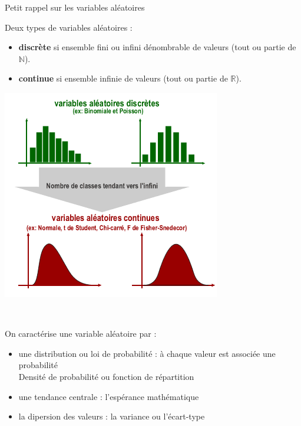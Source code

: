 \documentclass{beamer}
\newcommand{\N}{\mathbb{N}}
\begin{document}
\begin{frame}{Petit rappel sur les variables aléatoires}

\begin{minipage}{0.6\linewidth}
Deux types de variables aléatoires :
 \begin{itemize}
\item {\bf discrète} si ensemble fini ou infini dénombrable de
valeurs (tout ou partie de $\mathbb{\N}$).
\item {\bf continue} si ensemble infinie de valeurs (tout ou partie de $\mathbb{R}$).
\end{itemize}
\end{minipage}
\begin{minipage}{0.3\linewidth} 
\includegraphics[scale=0.45]{images/var_discretes_continues.png}
\end{minipage}

\

On caractérise une variable aléatoire par :
 \begin{itemize}
\item une distribution ou loi de probabilité : à chaque valeur est associée une probabilité \\
Densité de probabilité ou fonction de répartition 
\item une tendance centrale : l'espérance mathématique 
\item la dipersion des valeurs : la variance ou l'écart-type
\end{itemize}

\end{frame}   
    
\end{document}
